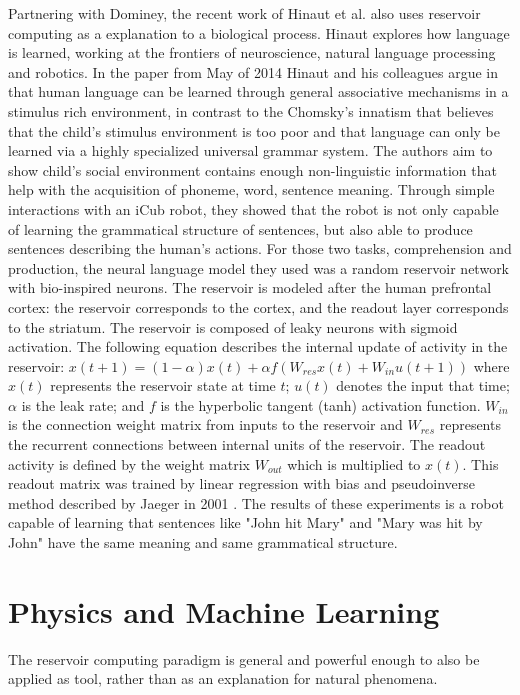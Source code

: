 \documentclass[12pt,oneside]{CUNY_CS_PhD}
\begin{document}
\noindent Partnering with Dominey, the recent work of Hinaut et al. \cite{hinaut_2012, hinaut_exploring_2014} also uses reservoir computing as a explanation to a biological process. Hinaut explores how language is learned, working at the frontiers of neuroscience, natural language processing and robotics. In the paper from May of 2014 \cite{hinaut_exploring_2014} Hinaut and his colleagues argue in that human language can be learned through general associative mechanisms in a stimulus rich environment, in contrast to the Chomsky's innatism that believes that the child's stimulus environment is too poor and that language can only be learned via a highly specialized universal grammar system.  The authors aim to show child's social environment contains enough non-linguistic information that help with the acquisition of phoneme, word, sentence meaning. Through simple interactions with an iCub robot, they showed that the robot is not only capable of learning the grammatical structure of sentences, but also able to produce sentences describing the human's actions. For those two tasks, comprehension and production, the neural language model they used was a random reservoir network with bio-inspired neurons. The reservoir is modeled after the human prefrontal cortex: the reservoir corresponds to the cortex, and the readout layer corresponds to the striatum. The reservoir is composed of leaky neurons with sigmoid activation. The following equation describes the internal update of activity in the reservoir: $x(t + 1) = (1 − \alpha)x(t) + \alpha f (W_{res}x(t ) + W_{in}u(t + 1))$ where $x(t)$ represents the reservoir state at time $t$; $u(t)$ denotes the input that time;$\alpha$ is the leak rate; and $f$ is the hyperbolic tangent (tanh) activation function. $W_{in}$ is the connection weight matrix from inputs to the reservoir and $W_{res}$ represents the recurrent connections between internal units of the reservoir. The readout activity is defined by the weight matrix $W_{out}$ which is multiplied to $x(t)$. This readout matrix was trained by linear regression with bias and pseudoinverse method described by Jaeger in 2001 \cite{jaeger_echo_2001}. The results of these experiments is a robot capable of learning that sentences like "John hit Mary" and "Mary was hit by John" have the same meaning and same grammatical structure.\\

\section{Physics and Machine Learning}
The reservoir computing paradigm is general and powerful enough to also be applied as tool, rather than as an explanation for natural phenomena.
\end{document}
